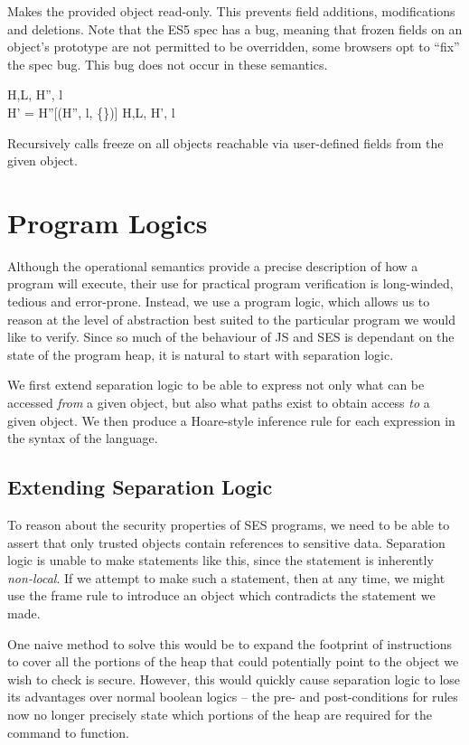 \documentclass[a4paper,notitlepage]{report}
\begin{document}
Makes the provided object read-only. This prevents field additions,
modifications and deletions.
Note that the ES5 spec has a bug, meaning that frozen fields on an object's
prototype are not permitted to be overridden, some browsers opt to ``fix'' the spec bug.
This bug does not occur in these semantics.

  {H,L, \gevalsto H'', l \\
   H' = H''[\auxDef(H'', l, \{\})]}
  {H,L, \evalsto H', l}

Recursively calls freeze on all objects reachable
via user-defined fields from the given object.

\chapter{Program Logics}
\label{chap:proglogic}
Although the operational semantics provide a precise description of how a
program will execute, their use for practical program verification is
long-winded, tedious and error-prone. Instead, we use a program logic, which
allows us to reason at the level of abstraction best suited to the particular
program we would like to verify. Since so much of the behaviour of JS and SES is
dependant on the state of the program heap, it is natural to start with
separation logic.

We first extend separation logic to be able to express not only what can be
accessed \emph{from} a given object, but also what paths exist to obtain access
\emph{to} a given object. We then produce a Hoare-style inference rule for each
expression in the syntax of the language.

\section{Extending Separation Logic}
\label{sec:extendingseplog}
To reason about the security properties of SES programs, we need to be able to
assert that only trusted objects contain references to sensitive data.
Separation logic is unable to make statements like this, since the
statement is inherently \emph{non-local}. If we attempt to make such a
statement, then at any time, we might use the frame rule to introduce an object
which contradicts the statement we made.

One naive method to solve this would be to expand the footprint of instructions
to cover all the portions of the heap that could potentially point to the object
we wish to check is secure. However, this would quickly cause separation logic
to lose its advantages over normal boolean logics -- the pre- and
post-conditions for rules now no longer precisely state which portions of the
heap are required for the command to function.
\end{document}
